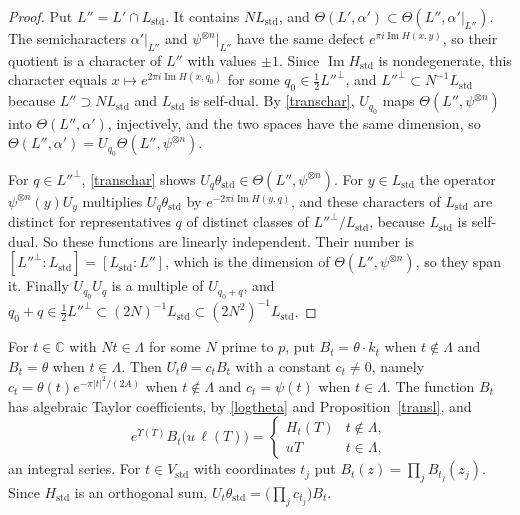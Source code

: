 \begin{proof}
Put $L''=L'\cap L_{\mathrm{std}}$. It contains $NL_{\mathrm{std}}$, and $\Theta(L',\alpha')\subset\Theta(L'',\alpha'|_{L''})$. The semicharacters $\alpha'|_{L''}$ and $\psi^{\otimes n}|_{L''}$ have the same defect $e^{\pi i\operatorname{Im}H(x,y)}$, so their quotient is a character of $L''$ with values $\pm1$. Since $\operatorname{Im}H_{\mathrm{std}}$ is nondegenerate, this character equals $x\mapsto e^{2\pi i\operatorname{Im}H(x,q_0)}$ for some $q_0\in\frac12L''^\perp$, and $L''^\perp\subset N^{-1}L_{\mathrm{std}}$ because $L''\supset NL_{\mathrm{std}}$ and $L_{\mathrm{std}}$ is self-dual. By \eqref{transchar}, $U_{q_0}$ maps $\Theta(L'',\psi^{\otimes n})$ into $\Theta(L'',\alpha')$, injectively, and the two spaces have the same dimension, so $\Theta(L'',\alpha')=U_{q_0}\Theta(L'',\psi^{\otimes n})$.

For $q\in L''^\perp$, \eqref{transchar} shows $U_q\theta_{\mathrm{std}}\in\Theta(L'',\psi^{\otimes n})$. For $y\in L_{\mathrm{std}}$ the operator $\psi^{\otimes n}(y)U_y$ multiplies $U_q\theta_{\mathrm{std}}$ by $e^{-2\pi i\operatorname{Im}H(y,q)}$, and these characters of $L_{\mathrm{std}}$ are distinct for representatives $q$ of distinct classes of $L''^\perp/L_{\mathrm{std}}$, because $L_{\mathrm{std}}$ is self-dual. So these functions are linearly independent. Their number is $[L''^\perp:L_{\mathrm{std}}]=[L_{\mathrm{std}}:L'']$, which is the dimension of $\Theta(L'',\psi^{\otimes n})$, so they span it. Finally $U_{q_0}U_q$ is a multiple of $U_{q_0+q}$, and $q_0+q\in\frac12L''^\perp\subset(2N)^{-1}L_{\mathrm{std}}\subset(2N^2)^{-1}L_{\mathrm{std}}$.
\end{proof}

For $t\in\mathbb C$ with $Nt\in\Lambda$ for some $N$ prime to $p$, put $B_t=\theta\cdot k_t$ when $t\notin\Lambda$ and $B_t=\theta$ when $t\in\Lambda$. Then $U_t\theta=c_tB_t$ with a constant $c_t\ne0$, namely $c_t=\theta(t)e^{-\pi\lvert t\rvert^2/(2A)}$ when $t\notin\Lambda$ and $c_t=\psi(t)$ when $t\in\Lambda$. The function $B_t$ has algebraic Taylor coefficients, by \eqref{logtheta} and Proposition~\ref{transl}, and
\begin{equation}\label{Bint}
e^{\Upsilon(T)}B_t\big(u\,\ell(T)\big)=\begin{cases}H_t(T)&t\notin\Lambda,\\uT&t\in\Lambda,\end{cases}
\end{equation}
an integral series. For $t\in V_{\mathrm{std}}$ with coordinates $t_j$ put $B_t(z)=\prod_jB_{t_j}(z_j)$. Since $H_{\mathrm{std}}$ is an orthogonal sum, $U_t\theta_{\mathrm{std}}=\big(\prod_jc_{t_j}\big)B_t$.


